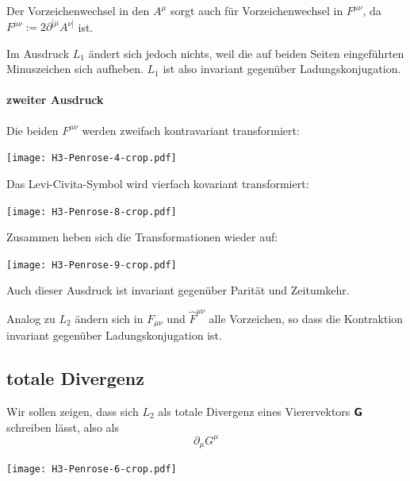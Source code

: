 Der Vorzeichenwechsel in den $A^\mu$ sorgt auch für Vorzeichenwechsel in
$F^{\mu\nu}$, da $F^{\mu\nu} := 2 \partial^{[\mu} A^{\nu]}$ ist.

Im Ausdruck $L_1$ ändert sich jedoch nichts, weil die auf beiden Seiten
eingeführten Minuszeichen sich aufheben. $L_1$ ist also invariant gegenüber
Ladungskonjugation.

\paragraph{zweiter Ausdruck}

Die beiden $F^{\mu\nu}$ werden zweifach kontravariant transformiert:
\begin{center}
	\texttt{[image: H3-Penrose-4-crop.pdf]}
\end{center}

Das Levi-Civita-Symbol wird vierfach kovariant transformiert:
\begin{center}
	\texttt{[image: H3-Penrose-8-crop.pdf]}
\end{center}

Zusammen heben sich die Transformationen wieder auf:
\begin{center}
	\texttt{[image: H3-Penrose-9-crop.pdf]}
\end{center}

Auch dieser Ausdruck ist invariant gegenüber Parität und Zeitumkehr.

Analog zu $L_2$ ändern sich in $F_{\mu\nu}$ und $\hat F^{\mu\nu}$ alle
Vorzeichen, so dass die Kontraktion invariant gegenüber Ladungskonjugation ist.

\subsection{totale Divergenz}

Wir sollen zeigen, dass sich $L_2$ als totale Divergenz eines Vierervektors
$\boldsymbol{\mathsf{G}}$ schreiben lässt, also als
\[
	\partial_\mu G^\mu
\]
\begin{center}
	\texttt{[image: H3-Penrose-6-crop.pdf]}
\end{center}

